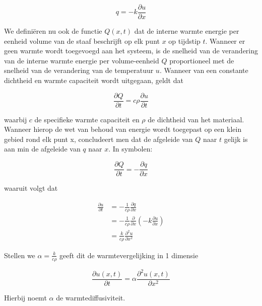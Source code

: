 \documentclass[a4paper,kulak]{kulakarticle} %
\begin{document}
\begin{equation*}
	q = -k\frac{\partial u}{\partial x}
\end{equation*}

We definiëren nu ook de functie $Q(x, t)$ dat de interne warmte energie per eenheid volume van de staaf beschrijft op elk punt $x$ op tijdstip $t$. Wanneer er geen warmte wordt toegevoegd aan het systeem, is de snelheid van de verandering van de interne warmte energie per volume-eenheid $Q$ proportioneel met de snelheid van de verandering van de temperatuur $u$. Wanneer van een constante dichtheid en warmte capaciteit wordt uitgegaan, geldt dat

\begin{equation}
	\frac{\partial Q}{\partial t} = c \rho \frac{\partial u}{\partial t}
\end{equation}

waarbij $c$ de specifieke warmte capaciteit en $\rho$ de dichtheid van het materiaal. 
Wanneer hierop de wet van behoud van energie wordt toegepast op een klein gebied rond elk punt x, concludeert men dat de afgeleide van $Q$ naar $t$ gelijk is aan min de afgeleide van $q$ naar $x$. In symbolen:

\begin{equation*}
	\frac{\partial Q}{\partial t} = - \frac{\partial q}{\partial x}
\end{equation*}

waaruit volgt dat

\begin{equation*}
	\begin{split}
	\frac{\partial u}{\partial t} &= - \frac{1}{c\rho} \frac{\partial q}{\partial x} \\
	&= - \frac{1}{c\rho} \frac{\partial}{\partial x} 
		\left( - k \frac{\partial u}{\partial x} \right) \\
	&= \frac{k}{c\rho} \frac{\partial^2u}{\partial x^2}
	\end{split}
\end{equation*}

Stellen we $\alpha = \frac{k}{c \rho}$ geeft dit de warmtevergelijking in 1 dimensie

\begin{equation}
	\frac{\partial u(x, t)}{\partial t} = \alpha \frac{\partial^2u(x, t)}{\partial x^2}
	\label{eq:1D_heat}
\end{equation}

Hierbij noemt $\alpha$ de warmtediffusiviteit. %
\end{document}
